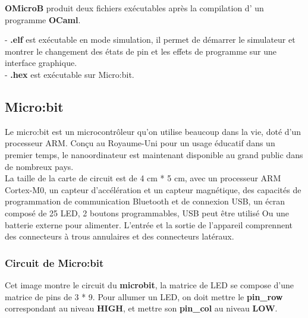 \documentclass[14px]{article}
\begin{document}
\textbf{OMicroB} produit deux fichiers exécutables après la compilation d'  un programme \textbf{OCaml}.

- \textbf{.elf} est exécutable en mode simulation, il permet de démarrer le simulateur et montrer le changement des états de pin et les effets de programme sur une interface graphique.\\
- \textbf{.hex} est exécutable sur Micro:bit.

\subsection{Micro:bit}
Le micro:bit est un microcontrôleur qu'on utilise beaucoup dans la vie, doté d'un processeur ARM. Conçu au Royaume-Uni pour un usage éducatif dans un premier temps, le nanoordinateur est maintenant disponible au grand public dans de nombreux pays.\\

La taille de la carte de circuit est de 4 cm * 5 cm, avec un processeur ARM Cortex-M0, un capteur d'accélération et un capteur magnétique, des capacités de programmation de communication Bluetooth et de connexion USB, un écran composé de 25 LED, 2 boutons programmables, USB peut être utilisé Ou une batterie externe pour alimenter. L'entrée et la sortie de l'appareil comprennent des connecteurs à trous annulaires et des connecteurs latéraux.

\subsubsection{Circuit de Micro:bit}
Cet image montre le circuit du \textbf{microbit}, la matrice de LED se compose d'une matrice de pins de 3 * 9. Pour allumer un LED, on doit mettre le \textbf{pin\_row} correspondant au niveau \textbf{HIGH}, et mettre son \textbf{pin\_col} au niveau \textbf{LOW}.

\begin{figure}
\end{figure}
\end{document}
